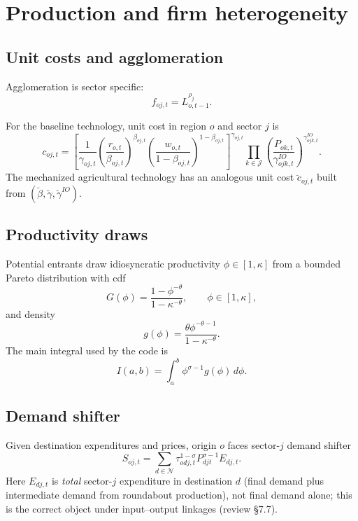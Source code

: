 \documentclass[11pt]{article}
\newcommand{\Nreg}{\mathcal{N}}
\newcommand{\Sct}{\mathcal{J}}
\begin{document}
\section{Production and firm heterogeneity}
\subsection{Unit costs and agglomeration}
Agglomeration is sector specific:
\begin{equation}
  f_{oj,t} = L_{o,t-1}^{\rho_j}.
\end{equation}

For the baseline technology, unit cost in region $o$ and sector $j$ is
\begin{equation}
  c_{oj,t}
  =
  \left[
    \frac{1}{\gamma_{oj,t}}
    \left( \frac{r_{o,t}}{\beta_{oj,t}} \right)^{\beta_{oj,t}}
    \left( \frac{w_{o,t}}{1-\beta_{oj,t}} \right)^{1-\beta_{oj,t}}
  \right]^{\gamma_{oj,t}}
  \prod_{k \in \Sct}
  \left( \frac{P_{ok,t}}{\gamma^{IO}_{ojk,t}} \right)^{\gamma^{IO}_{ojk,t}}.
\end{equation}
The mechanized agricultural technology has an analogous unit cost
$\breve c_{oj,t}$ built from $(\breve\beta,\breve\gamma,\breve\gamma^{IO})$.

\subsection{Productivity draws}
Potential entrants draw idiosyncratic productivity $\phi \in [1,\kappa]$ from a bounded
Pareto distribution with cdf
\begin{equation}
  G(\phi) = \frac{1 - \phi^{-\theta}}{1 - \kappa^{-\theta}},
  \qquad \phi \in [1,\kappa],
\end{equation}
and density
\begin{equation}
  g(\phi) = \frac{\theta \phi^{-\theta-1}}{1 - \kappa^{-\theta}}.
\end{equation}
The main integral used by the code is
\begin{equation}
  I(a,b) = \int_a^b \phi^{\sigma-1} g(\phi)\, d\phi.
\end{equation}

\subsection{Demand shifter}
Given destination expenditures and prices, origin $o$ faces sector-$j$ demand shifter
\begin{equation}
  S_{oj,t}
  = \sum_{d \in \Nreg} \tau_{odj,t}^{1-\sigma} P_{djt}^{\sigma-1} E_{dj,t}.
\end{equation}
Here $E_{dj,t}$ is \emph{total} sector-$j$ expenditure in destination $d$ (final demand
plus intermediate demand from roundabout production), not final demand alone; this is the
correct object under input--output linkages (review \S7.7).
\end{document}
